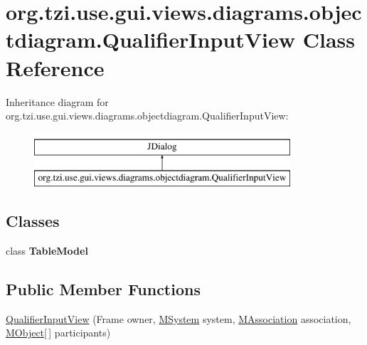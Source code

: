 \hypertarget{classorg_1_1tzi_1_1use_1_1gui_1_1views_1_1diagrams_1_1objectdiagram_1_1_qualifier_input_view}{\section{org.\-tzi.\-use.\-gui.\-views.\-diagrams.\-objectdiagram.\-Qualifier\-Input\-View Class Reference}
\label{classorg_1_1tzi_1_1use_1_1gui_1_1views_1_1diagrams_1_1objectdiagram_1_1_qualifier_input_view}
}
Inheritance diagram for org.\-tzi.\-use.\-gui.\-views.\-diagrams.\-objectdiagram.\-Qualifier\-Input\-View\-:\begin{figure}[H]
\begin{center}
\leavevmode
\includegraphics[height=2.000000cm]{classorg_1_1tzi_1_1use_1_1gui_1_1views_1_1diagrams_1_1objectdiagram_1_1_qualifier_input_view}
\end{center}
\end{figure}
\subsection*{Classes}
\begin{DoxyCompactItemize}
\item 
class {\bfseries Table\-Model}
\end{DoxyCompactItemize}
\subsection*{Public Member Functions}
\begin{DoxyCompactItemize}
\item 
\hyperlink{classorg_1_1tzi_1_1use_1_1gui_1_1views_1_1diagrams_1_1objectdiagram_1_1_qualifier_input_view_ae6e3d762349b854c83a95fbbbb1abd98}{Qualifier\-Input\-View} (Frame owner, \hyperlink{classorg_1_1tzi_1_1use_1_1uml_1_1sys_1_1_m_system}{M\-System} system, \hyperlink{interfaceorg_1_1tzi_1_1use_1_1uml_1_1mm_1_1_m_association}{M\-Association} association, \hyperlink{interfaceorg_1_1tzi_1_1use_1_1uml_1_1sys_1_1_m_object}{M\-Object}\mbox{[}$\,$\mbox{]} participants)
\end{DoxyCompactItemize}
